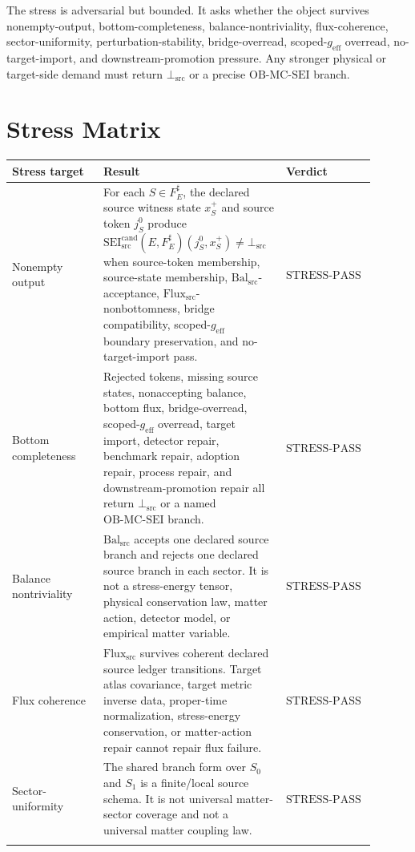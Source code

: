 \documentclass[11pt]{article}
\newcommand{\geff}{g_{\mathrm{eff}}}
\newcommand{\SEICand}{\mathrm{SEI}_{\mathrm{src}}^{\mathrm{cand}}}
\newcommand{\BalSrc}{\mathrm{Bal}_{\mathrm{src}}}
\newcommand{\FluxSrc}{\mathrm{Flux}_{\mathrm{src}}}
\newcommand{\BottomSrc}{\bot_{\mathrm{src}}}
\newcommand{\OBMCSEI}{\mathrm{OB}\mbox{-}\mathrm{MC}\mbox{-}\mathrm{SEI}}
\newcommand{\StressPass}{\mathrm{STRESS}\mbox{-}\mathrm{PASS}}
\begin{document}
The stress is adversarial but bounded. It asks whether the object survives
nonempty-output, bottom-completeness, balance-nontriviality, flux-coherence,
sector-uniformity, perturbation-stability, bridge-overread, scoped-\(\geff\)
overread, no-target-import, and downstream-promotion pressure. Any stronger
physical or target-side demand must return \(\BottomSrc\) or a precise
\(\OBMCSEI\) branch.

\section{Stress Matrix}

\begin{longtable}{p{0.24\linewidth}p{0.48\linewidth}p{0.18\linewidth}}
\toprule
Stress target & Result & Verdict \\
\midrule
Nonempty output &
For each \(S\in F_E^\sharp\), the declared source witness state \(x_S^+\)
and source token \(j_S^0\) produce
\(\SEICand(E,F_E^\sharp)(j_S^0,x_S^+)\neq\BottomSrc\) when source-token
membership, source-state membership, \(\BalSrc\)-acceptance,
\(\FluxSrc\)-nonbottomness, bridge compatibility, scoped-\(\geff\) boundary
preservation, and no-target-import pass. & \(\StressPass\) \\
\addlinespace
Bottom completeness &
Rejected tokens, missing source states, nonaccepting balance, bottom flux,
bridge-overread, scoped-\(\geff\) overread, target import, detector repair,
benchmark repair, adoption repair, process repair, and downstream-promotion
repair all return \(\BottomSrc\) or a named \(\OBMCSEI\) branch. &
\(\StressPass\) \\
\addlinespace
Balance nontriviality &
\(\BalSrc\) accepts one declared source branch and rejects one declared
source branch in each sector. It is not a stress-energy tensor, physical
conservation law, matter action, detector model, or empirical matter variable.
& \(\StressPass\) \\
\addlinespace
Flux coherence &
\(\FluxSrc\) survives coherent declared source ledger transitions. Target
atlas covariance, target metric inverse data, proper-time normalization,
stress-energy conservation, or matter-action repair cannot repair flux
failure. & \(\StressPass\) \\
\addlinespace
Sector-uniformity &
The shared branch form over \(S_0\) and \(S_1\) is a finite/local source
schema. It is not universal matter-sector coverage and not a universal matter
coupling law. & \(\StressPass\) \\
\addlinespace

\end{longtable}
\end{document}
